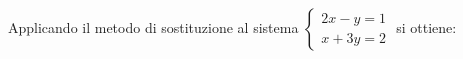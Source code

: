 Applicando il metodo di sostituzione al sistema 
$\displaystyle
\left\{
\begin{array}{l}
\displaystyle 2x - y = 1 \\
\displaystyle x + 3y = 2
\end{array}
\right.
$
si ottiene:
